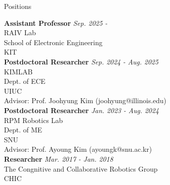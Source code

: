 \begin{rSection}{Positions}

{\bf Assistant Professor} \hfill {\em Sep. 2025 -} \\
\acf{RAIV} Lab \\ 
School of Electronic Engineering \\
\acf{KIT}\\    

{\bf Postdoctoral Researcher} \hfill {\em Sep. 2024 - Aug. 2025} \\
\acf{KIMLAB} \\ 
Dept. of \acf{ECE} \\
\acf{UIUC}\\
Advisor: Prof. Joohyung Kim (joohyung@illinois.edu) \\

{\bf Postdoctoral Researcher} \hfill {\em Jan. 2023 - Aug. 2024} \\
\acf{RPM} Robotics Lab \\ 
Dept. of \acf{ME} \\
\acf{SNU}\\
Advisor: Prof. Ayoung Kim (ayoungk@snu.ac.kr) \\





{\bf Researcher} \hfill {\em Mar. 2017 - Jan. 2018} \\
The Congnitive and Collaborative Robotics Group\\
\acf{CHIC}\\


\end{rSection}

